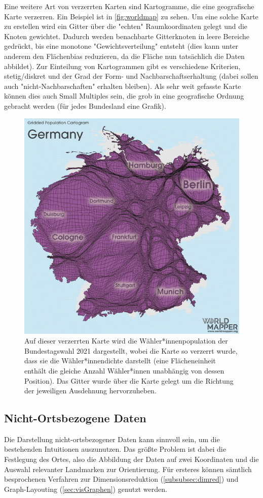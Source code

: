 				Eine weitere Art von verzerrten Karten sind Kartogramme, die eine geografische Karte verzerren. Ein Beispiel ist in \autoref{fig:worldmap} zu sehen. Um eine solche Karte zu erstellen wird ein Gitter über die "echten" Raumkoordinaten gelegt und die Knoten gewichtet. Dadurch werden benachbarte Gitterknoten in leere Bereiche gedrückt, bis eine monotone "Gewichtsverteilung" entsteht (dies kann unter anderem den Flächenbias reduzieren, da die Fläche nun tatsächlich die Daten abbildet). Zur Einteilung von Kartogrammen gibt es verschiedene Kriterien, \zB stetig/diskret und der Grad der Form- und Nachbarschaftserhaltung (dabei sollen auch "nicht-Nachbarschaften" erhalten bleiben). Als sehr weit gefasste Karte können dies auch Small Multiples sein, die grob in eine geografische Ordnung gebracht werden (\zB für jedes Bundesland eine Grafik).

				\begin{figure}
					\centering
					\includegraphics[width=0.6\linewidth]{worldmapper}
					\caption[Beispiel für eine verzerrte Karte]{Auf dieser verzerrten Karte wird die Wähler*innenpopulation der Bundestagswahl 2021 dargestellt, wobei die Karte so verzerrt wurde, dass sie die Wähler*innendichte darstellt (\dh eine Flächeneinheit enthält die gleiche Anzahl Wähler*innen unabhängig von dessen Position). Das Gitter wurde über die Karte gelegt um die Richtung der jeweiligen Ausdehnung hervorzuheben.}
					\label{fig:worldmap}
				\end{figure}

		\subsection{Nicht-Ortsbezogene Daten}
			Die Darstellung nicht-ortsbezogener Daten kann \zB sinnvoll sein, um die bestehenden Intuitionen auszunutzen. Das größte Problem ist dabei die Festlegung des Ortes, also die Abbildung der Daten auf zwei Koordinaten und die Auswahl relevanter Landmarken zur Orientierung. Für ersteres können sämtlich besprochenen Verfahren zur Dimensionsreduktion (\autoref{subsubsec:dimred}) und Graph-Layouting (\autoref{sec:visGraphen}) genutzt werden.

